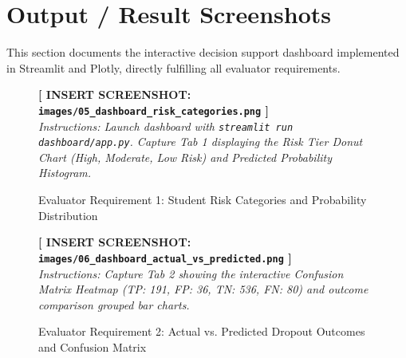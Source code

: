\documentclass[11pt,a4paper]{article}
\begin{document}
\section{Output / Result Screenshots}
\label{sec:output_screenshots}

This section documents the interactive decision support dashboard implemented in Streamlit and Plotly, directly fulfilling all evaluator requirements.

\begin{figure}[H]
    \centering
    \begin{tcolorbox}[colback=gray!10,colframe=gray!60,title=\textbf{SCREENSHOT 5: Compulsory 1 -- Risk Categories \& Distribution (Tab 1)}]
        \vspace{3.5cm}
        \centering
        \textbf{[ INSERT SCREENSHOT: \texttt{images/05\_dashboard\_risk\_categories.png} ]}\\[6pt]
        \textit{Instructions: Launch dashboard with \texttt{streamlit run dashboard/app.py}. Capture Tab 1 displaying the Risk Tier Donut Chart (High, Moderate, Low Risk) and Predicted Probability Histogram.}
        \vspace{0.5cm}
    \end{tcolorbox}
    \caption{Evaluator Requirement 1: Student Risk Categories and Probability Distribution}
    \label{fig:out_tab1}
\end{figure}

\begin{figure}[H]
    \centering
    \begin{tcolorbox}[colback=gray!10,colframe=gray!60,title=\textbf{SCREENSHOT 6: Compulsory 2 -- Actual vs. Predicted Outcomes (Tab 2)}]
        \vspace{3.5cm}
        \centering
        \textbf{[ INSERT SCREENSHOT: \texttt{images/06\_dashboard\_actual\_vs\_predicted.png} ]}\\[6pt]
        \textit{Instructions: Capture Tab 2 showing the interactive Confusion Matrix Heatmap (TP: 191, FP: 36, TN: 536, FN: 80) and outcome comparison grouped bar charts.}
        \vspace{0.5cm}
    \end{tcolorbox}
    \caption{Evaluator Requirement 2: Actual vs. Predicted Dropout Outcomes and Confusion Matrix}
    \label{fig:out_tab2}
\end{figure}
\end{document}
